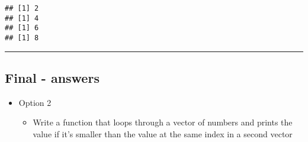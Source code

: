\documentclass[]{article}
\newenvironment{Shaded}{\begin{snugshade}}{\end{snugshade}}
\newcommand{\ControlFlowTok}[1]{\textcolor[rgb]{0.13,0.29,0.53}{\textbf{#1}}}
\newcommand{\DataTypeTok}[1]{\textcolor[rgb]{0.13,0.29,0.53}{#1}}
\newcommand{\DecValTok}[1]{\textcolor[rgb]{0.00,0.00,0.81}{#1}}
\newcommand{\KeywordTok}[1]{\textcolor[rgb]{0.13,0.29,0.53}{\textbf{#1}}}
\newcommand{\NormalTok}[1]{#1}
\newcommand{\OperatorTok}[1]{\textcolor[rgb]{0.81,0.36,0.00}{\textbf{#1}}}
\newcommand{\StringTok}[1]{\textcolor[rgb]{0.31,0.60,0.02}{#1}}
\providecommand{\tightlist}{%
  \setlength{\itemsep}{0pt}\setlength{\parskip}{0pt}}
\begin{document}
\begin{Shaded}
\end{Shaded}

\begin{verbatim}
## [1] 2
## [1] 4
## [1] 6
## [1] 8
\end{verbatim}

\begin{center}\rule{0.5\linewidth}{\linethickness}\end{center}

\hypertarget{final---answers-1}{%
\subsection{Final - answers}\label{final---answers-1}}

\begin{itemize}
\tightlist
\item
  Option 2

  \begin{itemize}
  \tightlist
  \item
    Write a function that loops through a vector of numbers and prints
    the value if it's smaller than the value at the same index in a
    second vector
  \end{itemize}
\end{itemize}
\end{document}
